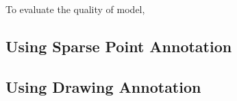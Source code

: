 To evaluate the quality of model, 

\subsection{Using Sparse Point Annotation}

\subsection{Using Drawing Annotation}

\clearpage